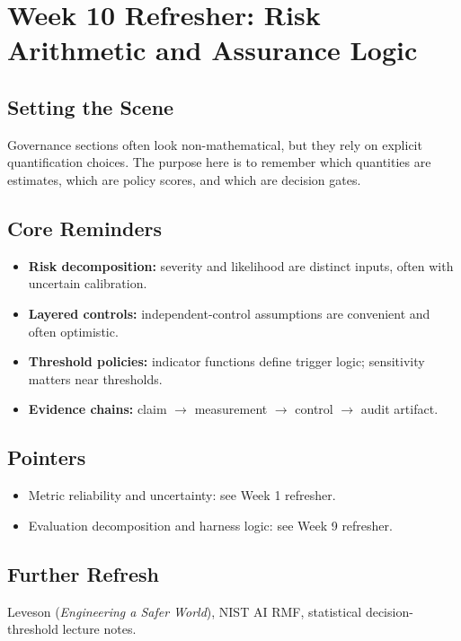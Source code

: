 \section{Week 10 Refresher: Risk Arithmetic and Assurance Logic}

\subsection*{Setting the Scene}
Governance sections often look non-mathematical, but they rely on explicit quantification choices. The purpose here is to remember which quantities are estimates, which are policy scores, and which are decision gates.

\subsection*{Core Reminders}
\begin{itemize}[leftmargin=1.5em]
  \item \textbf{Risk decomposition:} severity and likelihood are distinct inputs, often with uncertain calibration.
  \item \textbf{Layered controls:} independent-control assumptions are convenient and often optimistic.
  \item \textbf{Threshold policies:} indicator functions define trigger logic; sensitivity matters near thresholds.
  \item \textbf{Evidence chains:} claim $\to$ measurement $\to$ control $\to$ audit artifact.
\end{itemize}

\subsection*{Pointers}
\begin{itemize}[leftmargin=1.5em]
  \item Metric reliability and uncertainty: see Week 1 refresher.
  \item Evaluation decomposition and harness logic: see Week 9 refresher.
\end{itemize}

\subsection*{Further Refresh}
Leveson (\emph{Engineering a Safer World}), NIST AI RMF, statistical decision-threshold lecture notes.

